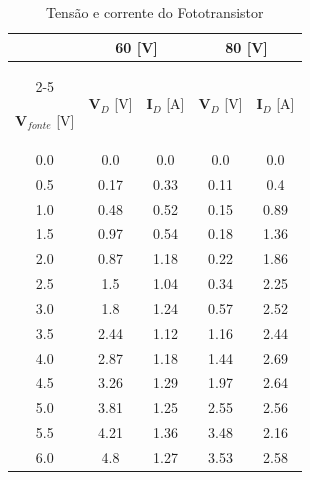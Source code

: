 \begin{table}[!h]
    \centering
    \caption{Tensão e corrente do Fototransistor}
    \label{tab:circ2}
    \vspace{0.25cm}
    \begin{tabular}{c|cc|cc} 
        \hline
        \rule{0pt}{3ex} & \multicolumn{2}{c}{\textbf{60} [V]} & \multicolumn{2}{c}{\textbf{80} [V]} \\
        \cline{2-5} 
        \rule{0pt}{3ex}\textbf{V}$_{fonte}$ [V] & $\mathbf{V}_{D}$ [V] & $\mathbf{I}_{D}$ [A] & $\mathbf{V}_{D}$ [V] & $\mathbf{I}_{D}$ [A] \\[5pt]
        \hline
        \rule{0pt}{3ex}0.0 & 0.0 & 0.0 & 0.0 & 0.0 \\
        0.5 & 0.17 & 0.33 & 0.11 & 0.4 \\
        1.0 & 0.48 & 0.52 & 0.15 & 0.89 \\
        1.5 & 0.97 & 0.54 & 0.18 & 1.36 \\
        2.0 & 0.87 & 1.18 & 0.22 & 1.86 \\
        2.5 & 1.5 & 1.04 & 0.34 & 2.25 \\
        3.0 & 1.8 & 1.24 & 0.57 & 2.52 \\
        3.5 & 2.44 & 1.12 & 1.16 & 2.44 \\
        4.0 & 2.87 & 1.18 & 1.44 & 2.69 \\
        4.5 & 3.26 & 1.29 & 1.97 & 2.64 \\
        5.0 & 3.81 & 1.25 & 2.55 & 2.56 \\
        5.5 & 4.21 & 1.36 & 3.48 & 2.16 \\
        6.0 & 4.8 & 1.27 & 3.53 & 2.58 \\ [5pt]
        \hline
    \end{tabular}
\end{table}
